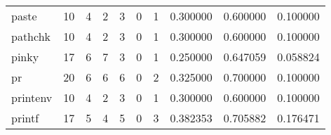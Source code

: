 \begin{longtable}{lrrrrrrrrr}
paste     &                                      10 &                                                  4 &                                                  2 &                                                  3 &                                                  0 &                                                  1 &                                           0.300000 &                               0.600000 &                             0.100000 \\
pathchk   &                                      10 &                                                  4 &                                                  2 &                                                  3 &                                                  0 &                                                  1 &                                           0.300000 &                               0.600000 &                             0.100000 \\
pinky     &                                      17 &                                                  6 &                                                  7 &                                                  3 &                                                  0 &                                                  1 &                                           0.250000 &                               0.647059 &                             0.058824 \\
pr        &                                      20 &                                                  6 &                                                  6 &                                                  6 &                                                  0 &                                                  2 &                                           0.325000 &                               0.700000 &                             0.100000 \\
printenv  &                                      10 &                                                  4 &                                                  2 &                                                  3 &                                                  0 &                                                  1 &                                           0.300000 &                               0.600000 &                             0.100000 \\
printf    &                                      17 &                                                  5 &                                                  4 &                                                  5 &                                                  0 &                                                  3 &                                           0.382353 &                               0.705882 &                             0.176471 \\

\end{longtable}
